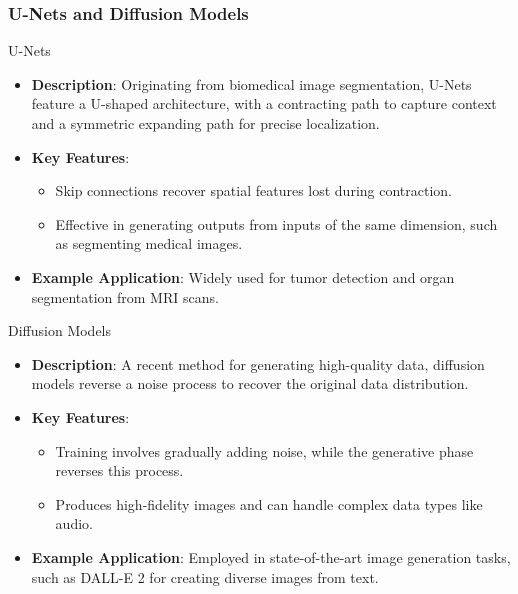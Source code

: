 \documentclass[aspectratio=169]{beamer}
\begin{document}
\begin{frame}[fragile]
    \frametitle{U-Nets and Diffusion Models}

    \begin{block}{U-Nets}
        \begin{itemize}
            \item \textbf{Description}: 
            Originating from biomedical image segmentation, U-Nets feature a U-shaped architecture, with a contracting path to capture context and a symmetric expanding path for precise localization.
            
            \item \textbf{Key Features}:
            \begin{itemize}
                \item Skip connections recover spatial features lost during contraction.
                \item Effective in generating outputs from inputs of the same dimension, such as segmenting medical images.
            \end{itemize}

            \item \textbf{Example Application}: 
            Widely used for tumor detection and organ segmentation from MRI scans.
        \end{itemize}
    \end{block}

    \vfill

    \begin{block}{Diffusion Models}
        \begin{itemize}
            \item \textbf{Description}: 
            A recent method for generating high-quality data, diffusion models reverse a noise process to recover the original data distribution.
            
            \item \textbf{Key Features}:
            \begin{itemize}
                \item Training involves gradually adding noise, while the generative phase reverses this process.
                \item Produces high-fidelity images and can handle complex data types like audio.
            \end{itemize}

            \item \textbf{Example Application}: 
            Employed in state-of-the-art image generation tasks, such as DALL-E 2 for creating diverse images from text.
        \end{itemize}
    \end{block}
\end{frame}
\end{document}
